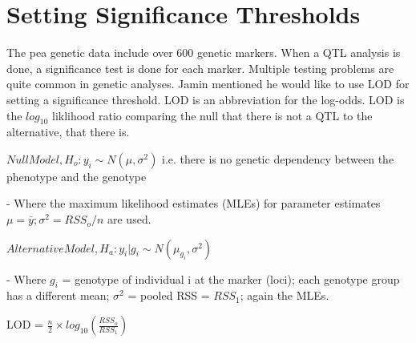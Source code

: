\documentclass[11pt]{article}\usepackage[]{graphicx}\usepackage[]{color}
\makeatletter
\newenvironment{kframe}{%
 \def\at@end@of@kframe{}%
 \ifinner\ifhmode%
  \def\at@end@of@kframe{\end{minipage}}%
  \begin{minipage}{\columnwidth}%
 \fi\fi%
 \def\FrameCommand##1{\hskip\@totalleftmargin \hskip-\fboxsep
 \colorbox{shadecolor}{##1}\hskip-\fboxsep
     \hskip-\linewidth \hskip-\@totalleftmargin \hskip\columnwidth}%
 \MakeFramed {\advance\hsize-\width
   \@totalleftmargin\z@ \linewidth\hsize
   \@setminipage}}%
 {\par\unskip\endMakeFramed%
 \at@end@of@kframe}
\newenvironment{knitrout}{}{} %
\makeatother
\begin{document}
\begin{knitrout}
\begin{kframe}
{\ttfamily\noindent\bfseries{}}

{\ttfamily\noindent\bfseries{}}

{\ttfamily\noindent\bfseries\color{errorcolor}{Error in subset(moccasin15, select = -c(X)): object 'moccasin15' not found}}

{\ttfamily\noindent\bfseries\color{errorcolor}{Error in ncol(x): object 'moccasin15' not found}}

{\ttfamily\noindent\bfseries{}}

{\ttfamily\noindent\bfseries\color{errorcolor}{Error in ncol(x): object 'moccasin16' not found}}\end{kframe}
\end{knitrout}





\section{Setting Significance Thresholds}

The pea genetic data include over 600 genetic markers. When a QTL analysis is done, a significance test is done for each marker. Multiple testing problems are quite common in genetic analyses. Jamin mentioned he would like to use LOD for setting a significance threshold. LOD is an abbreviation for the log-odds. LOD is the $log_{10}$ liklihood ratio comparing the null that there is not a QTL to the alternative, that there is.

$Null Model, H_{o}: y_{i} \sim N(\mu, \sigma^2)$ i.e. there is no genetic dependency between the phenotype and the genotype

- Where the maximum likelihood estimates (MLEs) for parameter estimates $\mu = \bar{y}; \sigma^2 = RSS_{o}/n$ are used.

$Alternative Model, H_{a}: y_{i}|g_{i} \sim N(\mu_{g_{i}}, \sigma^2)$

- Where $g_{i}$ = genotype of individual i at the marker (loci); each genotype group has a different mean; $\sigma^2$ = pooled RSS = $RSS_{1}$; again the MLEs. 

LOD = $\frac{n}{2} \times log_{10}(\frac{RSS_{o}}{RSS_{1}})$
\end{document}
